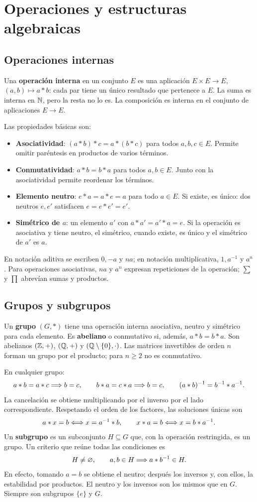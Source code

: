 \chapter{Operaciones y estructuras algebraicas}
\label{cap:estructuras}

\section{Operaciones internas}
Una \textbf{operación interna} en un conjunto $E$ es una aplicación
$E\times E\to E$, $(a,b)\mapsto a*b$: cada par tiene un único resultado
que pertenece a $E$. La suma es interna en $\mathbb{N}$, pero la resta no lo es.
La composición es interna en el conjunto de aplicaciones $E\to E$.

Las propiedades básicas son:
\begin{itemize}
\item \textbf{Asociatividad}: $(a*b)*c=a*(b*c)$ para todos $a,b,c\in E$.
Permite omitir paréntesis en productos de varios términos.
\item \textbf{Conmutatividad}: $a*b=b*a$ para todos $a,b\in E$.
Junto con la asociatividad permite reordenar los términos.
\item \textbf{Elemento neutro}: $e*a=a*e=a$ para todo $a\in E$.
Si existe, es único: dos neutros $e,e'$ satisfacen $e=e*e'=e'$.
\item \textbf{Simétrico de $a$}: un elemento $a'$ con $a*a'=a'*a=e$.
Si la operación es asociativa y tiene neutro, el simétrico, cuando existe,
es único y el simétrico de $a'$ es $a$.
\end{itemize}
En notación aditiva se escriben $0,-a$ y $na$; en notación multiplicativa,
$1,a^{-1}$ y $a^n$. Para operaciones asociativas, $na$ y $a^n$ expresan
repeticiones de la operación; $\sum$ y $\prod$ abrevían sumas y productos.

\section{Grupos y subgrupos}
\label{sec:grupos}
Un \textbf{grupo} $(G,*)$ tiene una operación interna asociativa, neutro
y simétrico para cada elemento. Es \textbf{abeliano} o conmutativo si,
además, $a*b=b*a$. Son abelianos $(\mathbb{Z},+)$, $(\mathbb{Q},+)$ y
$(\mathbb{Q}\setminus\{0\},\cdot)$. Las matrices invertibles de orden $n$
forman un grupo por el producto; para $n\ge2$ no es conmutativo.

En cualquier grupo:
\[
 a*b=a*c\Longrightarrow b=c,\qquad b*a=c*a\Longrightarrow b=c,
 \qquad (a*b)^{-1}=b^{-1}*a^{-1}.
\]
La cancelación se obtiene multiplicando por el inverso por el lado
correspondiente. Respetando el orden de los factores, las soluciones únicas son
\[
 a*x=b\Longleftrightarrow x=a^{-1}*b,\qquad
 x*a=b\Longleftrightarrow x=b*a^{-1}.
\]
Un \textbf{subgrupo} es un subconjunto $H\subseteq G$ que, con la operación
restringida, es un grupo. Un criterio que reúne todas las condiciones es
\[
 H\ne\varnothing,\qquad
 a,b\in H\Longrightarrow a*b^{-1}\in H.
\]
En efecto, tomando $a=b$ se obtiene el neutro; después los inversos y,
con ellos, la estabilidad por productos. El neutro y los inversos son
los mismos que en $G$. Siempre son subgrupos $\{e\}$ y $G$.

